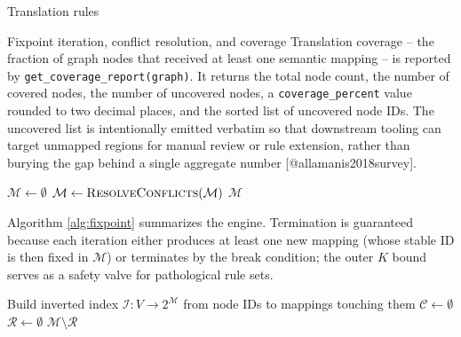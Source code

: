 \documentclass[
  ignorenonframetext,
]{beamer}
\begin{document}
\begin{frame}[fragile]{Translation rules}
\begin{block}{Fixpoint iteration, conflict resolution, and coverage}
Translation coverage -- the fraction of graph nodes that received at
least one semantic mapping -- is reported by
\texttt{get\_coverage\_report(graph)}. It returns the total node count,
the number of covered nodes, the number of uncovered nodes, a
\texttt{coverage\_percent} value rounded to two decimal places, and the
sorted list of uncovered node IDs. The uncovered list is intentionally
emitted verbatim so that downstream tooling can target unmapped regions
for manual review or rule extension, rather than burying the gap behind
a single aggregate number {[}@allamanis2018survey{]}.

\begin{algorithm}
\caption{Fixpoint translation engine}
\label{alg:fixpoint}
$\mathcal{M} \leftarrow \emptyset$\;
$\mathcal{M} \leftarrow \textsc{ResolveConflicts}(\mathcal{M})$\;
\Return $\mathcal{M}$\;
\end{algorithm}

Algorithm \ref{alg:fixpoint} summarizes the engine. Termination is
guaranteed because each iteration either produces at least one new
mapping (whose stable ID is then fixed in \(\mathcal{M}\)) or terminates
by the break condition; the outer \(K\) bound serves as a safety valve
for pathological rule sets.

\begin{algorithm}
\caption{Priority-ordered conflict resolution}
\label{alg:conflict}
Build inverted index $\mathcal{I}: V \to 2^{\mathcal{M}}$ from node IDs to mappings touching them\;
$\mathcal{C} \leftarrow \emptyset$ 
$\mathcal{R} \leftarrow \emptyset$ 
\Return $\mathcal{M} \setminus \mathcal{R}$\;
\end{algorithm}


\end{block}
\end{frame}
\end{document}
